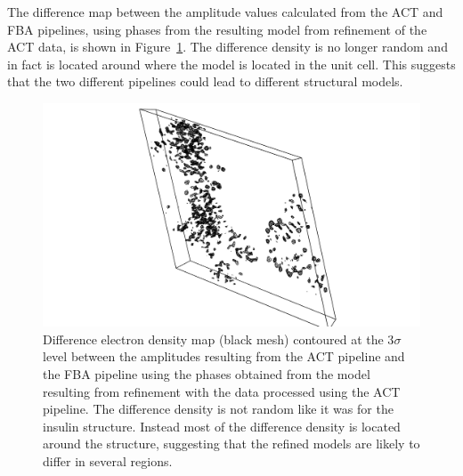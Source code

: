 The difference map between the amplitude values calculated from the ACT and FBA pipelines, using phases from the resulting model from refinement of the ACT data, is shown in Figure~\ref{fig:Difference electron density map - C.Esp1396I}.
The difference density is no longer random and in fact is located around where the model is located in the unit cell.
This suggests that the two different pipelines could lead to different structural models.
\begin{figure}[ht!]
    \centering
    \includegraphics[width=1.0\textwidth]{figures/datared/CPROT_diff_map.png}
    \caption{Difference electron density map (black mesh) contoured at the 3$\sigma$ level between the amplitudes resulting from the ACT pipeline and the FBA pipeline using the phases obtained from the model resulting from refinement with the data processed using the ACT pipeline.
    The difference density is not random like it was for the insulin structure.
    Instead most of the difference density is located around the structure, suggesting that the refined models are likely to differ in several regions.}
    \label{fig:Difference electron density map - C.Esp1396I}
\end{figure}

